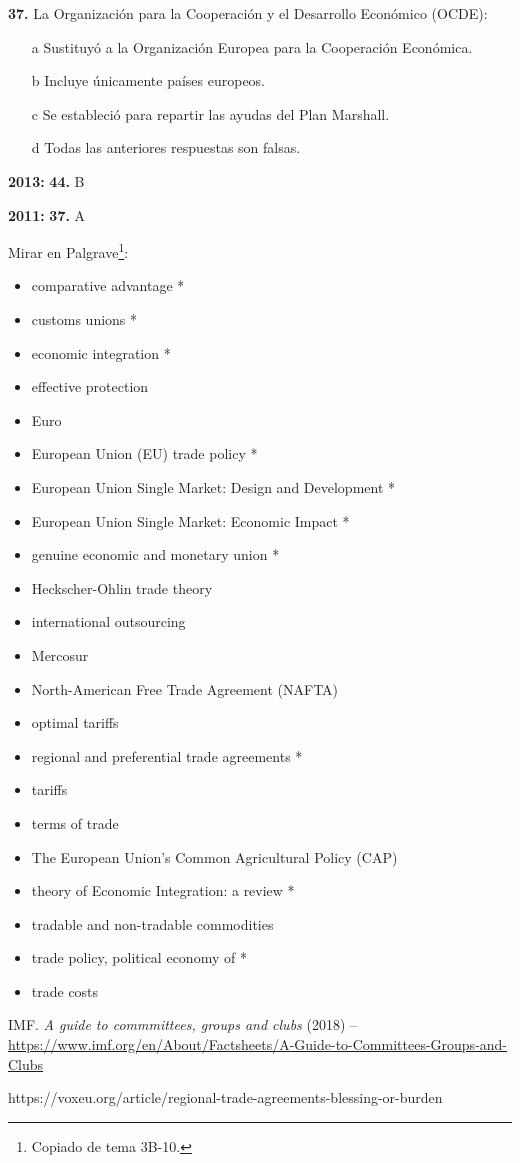 \documentclass{nuevotema}
\begin{document}

\textbf{37.} La Organización para la Cooperación y el Desarrollo Económico (OCDE):
\begin{itemize}
	\item[a] Sustituyó a la Organización Europea para la Cooperación Económica.
	\item[b] Incluye únicamente países europeos.
	\item[c] Se estableció para repartir las ayudas del Plan Marshall.
	\item[d] Todas las anteriores respuestas son falsas.
\end{itemize}

\notas

\textbf{2013:} \textbf{44.} B

\textbf{2011:} \textbf{37.} A

\bibliografia

Mirar en Palgrave\footnote{Copiado de tema 3B-10.}:
\begin{itemize}
	\item comparative advantage *
	\item customs unions *
	\item economic integration *
	\item effective protection
	\item Euro
	\item European Union (EU) trade policy *
	\item European Union Single Market: Design and Development *
	\item European Union Single Market: Economic Impact *
	\item genuine economic and monetary union *
	\item Heckscher-Ohlin trade theory
	\item international outsourcing
	\item Mercosur
	\item North-American Free Trade Agreement (NAFTA)
	\item optimal tariffs
	\item regional and preferential trade agreements *
	\item tariffs
	\item terms of trade
	\item The European Union's Common Agricultural Policy (CAP)
	\item theory of Economic Integration: a review *
	\item tradable and non-tradable commodities
	\item trade policy, political economy of *
	\item trade costs
\end{itemize}


IMF. \textit{A guide to commmittees, groups and clubs} (2018) -- \url{https://www.imf.org/en/About/Factsheets/A-Guide-to-Committees-Groups-and-Clubs}

 https://voxeu.org/article/regional-trade-agreements-blessing-or-burden
\end{document}
